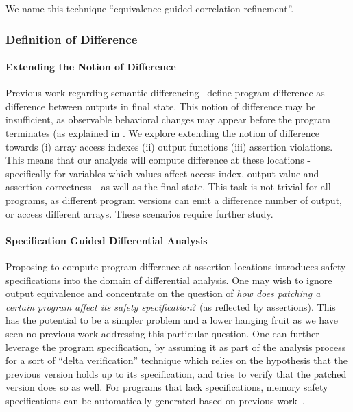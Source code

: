 We name this technique ``equivalence-guided correlation refinement''.

\subsubsection{Definition of Difference}

\paragraph{Extending the Notion of Difference}
Previous work regarding semantic differencing~\cite{DwyerElbaumPerson08, GodlinStrichman09, EnglerRamos11, HawblitzelKawaguchiLahiriRebelo12} define program difference as difference between outputs in final state. This notion of difference may be insufficient, as observable behavioral changes may appear before the program terminates (as explained in . We explore extending the notion of difference towards (i) array access indexes (ii) output functions (iii) assertion violations. This means that our analysis will compute difference at these locations - specifically for variables which values affect access index, output value and assertion correctness - as well as the final state. This task is not trivial for all programs, as different program versions can emit a difference number of output, or access different arrays. These scenarios require further study.

\paragraph{Specification Guided Differential Analysis}
Proposing to compute program difference at assertion locations introduces safety specifications into the domain of differential analysis. One may wish to ignore output equivalence and concentrate on the question of \emph{how does patching a certain program affect its safety specification}? (as reflected by assertions). This has the potential to be a simpler problem and a lower hanging fruit as we have seen no previous work addressing this particular question. One can further leverage the program specification, by assuming it as part of the analysis process for a sort of ``delta verification'' technique which relies on the hypothesis that the previous version holds up to its specification, and tries to verify that the patched version does so as well. For programs that lack specifications, memory safety specifications can be automatically generated based on previous work~\cite{ConditHarrenMcPeakNeculaWeimer03}.


